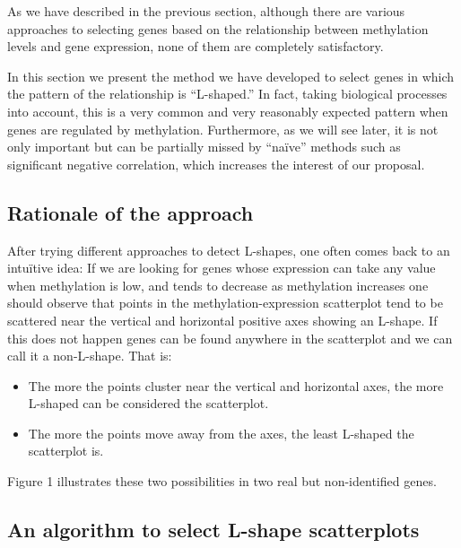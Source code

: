 \documentclass[10pt,letterpaper]{article}
\providecommand{\tightlist}{%
  \setlength{\itemsep}{0pt}\setlength{\parskip}{0pt}}
\begin{document}
As we have described in the previous section, although there are various
approaches to selecting genes based on the relationship between
methylation levels and gene expression, none of them are completely
satisfactory.

In this section we present the method we have developed to select genes
in which the pattern of the relationship is ``L-shaped.'' In fact,
taking biological processes into account, this is a very common and very
reasonably expected pattern when genes are regulated by methylation.
Furthermore, as we will see later, it is not only important but can be
partially missed by ``naïve'' methods such as significant negative
correlation, which increases the interest of our proposal.

\hypertarget{rationale-of-the-approach}{%
\subsection{Rationale of the approach}\label{rationale-of-the-approach}}

After trying different approaches to detect L-shapes, one often comes
back to an intuïtive idea: If we are looking for genes whose expression
can take any value when methylation is low, and tends to decrease as
methylation increases one should observe that points in the
methylation-expression scatterplot tend to be scattered near the
vertical and horizontal positive axes showing an L-shape. If this does
not happen genes can be found anywhere in the scatterplot and we can
call it a non-L-shape. That is:

\begin{itemize}
\tightlist
\item
  The more the points cluster near the vertical and horizontal axes, the
  more L-shaped can be considered the scatterplot.
\item
  The more the points move away from the axes, the least L-shaped the
  scatterplot is.
\end{itemize}

Figure 1 illustrates these two possibilities in two real but
non-identified genes.

\hypertarget{an-algorithm-to-select-l-shape-scatterplots}{%
\subsection{An algorithm to select L-shape
scatterplots}\label{an-algorithm-to-select-l-shape-scatterplots}}
\end{document}
